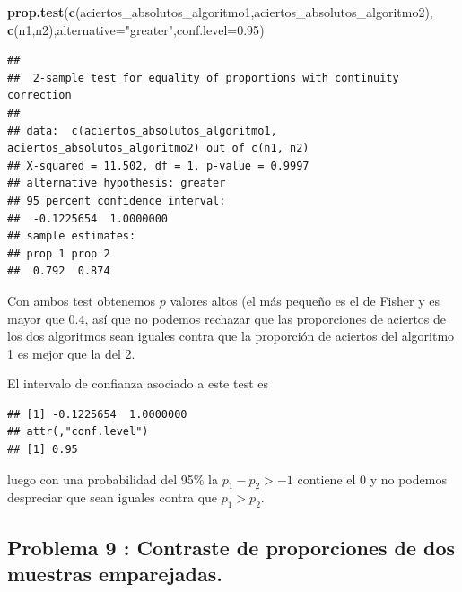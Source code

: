 \documentclass[
]{article}
\newenvironment{Shaded}{\begin{snugshade}}{\end{snugshade}}
\newcommand{\DataTypeTok}[1]{\textcolor[rgb]{0.13,0.29,0.53}{#1}}
\newcommand{\FloatTok}[1]{\textcolor[rgb]{0.00,0.00,0.81}{#1}}
\newcommand{\KeywordTok}[1]{\textcolor[rgb]{0.13,0.29,0.53}{\textbf{#1}}}
\newcommand{\NormalTok}[1]{#1}
\newcommand{\OperatorTok}[1]{\textcolor[rgb]{0.81,0.36,0.00}{\textbf{#1}}}
\newcommand{\StringTok}[1]{\textcolor[rgb]{0.31,0.60,0.02}{#1}}
\begin{document}
\begin{Shaded}
\begin{Highlighting}[]
\KeywordTok{prop.test}\NormalTok{(}\KeywordTok{c}\NormalTok{(aciertos\_absolutos\_algoritmo1,aciertos\_absolutos\_algoritmo2), }\KeywordTok{c}\NormalTok{(n1,n2),}\DataTypeTok{alternative=}\StringTok{"greater"}\NormalTok{,}\DataTypeTok{conf.level=}\FloatTok{0.95}\NormalTok{)}
\end{Highlighting}
\end{Shaded}

\begin{verbatim}
## 
##  2-sample test for equality of proportions with continuity correction
## 
## data:  c(aciertos_absolutos_algoritmo1, aciertos_absolutos_algoritmo2) out of c(n1, n2)
## X-squared = 11.502, df = 1, p-value = 0.9997
## alternative hypothesis: greater
## 95 percent confidence interval:
##  -0.1225654  1.0000000
## sample estimates:
## prop 1 prop 2 
##  0.792  0.874
\end{verbatim}

Con ambos test obtenemos \(p\) valores altos (el más pequeño es el de
Fisher y es mayor que \(0.4\), así que no podemos rechazar que las
proporciones de aciertos de los dos algoritmos sean iguales contra que
la proporción de aciertos del algoritmo 1 es mejor que la del 2.

El intervalo de confianza asociado a este test es

\begin{Shaded}
\end{Shaded}

\begin{verbatim}
## [1] -0.1225654  1.0000000
## attr(,"conf.level")
## [1] 0.95
\end{verbatim}

luego con una probabilidad del 95\% la \(p_1-p_2> -1\) contiene el 0 y
no podemos despreciar que sean iguales contra que \(p_1>p_2.\)

\hypertarget{problema-9-contraste-de-proporciones-de-dos-muestras-emparejadas.}{%
\subsection{Problema 9 : Contraste de proporciones de dos muestras
emparejadas.}\label{problema-9-contraste-de-proporciones-de-dos-muestras-emparejadas.}}
\end{document}
